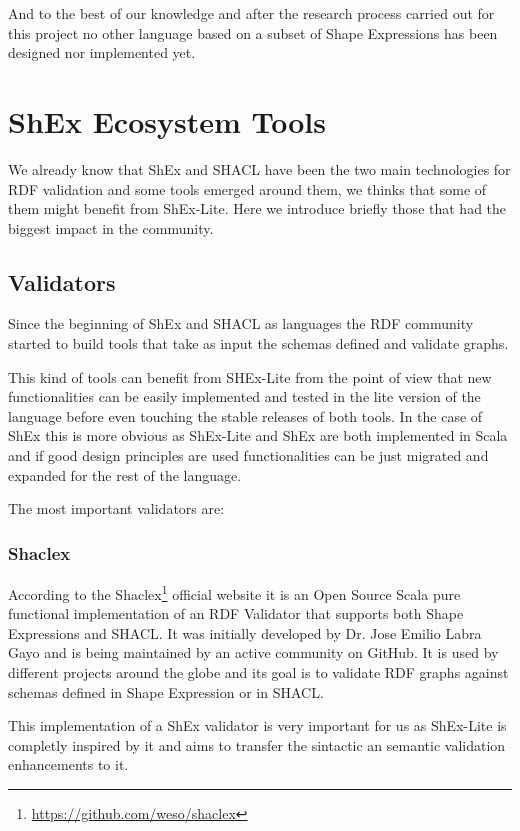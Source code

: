 \bigskip

And to the best of our knowledge and after the research process carried out for this
project no other language based on a subset of Shape Expressions has been designed nor implemented yet.


\section{ShEx Ecosystem Tools}
\label{sec:related-work-shex-ecosystem}

We already know that ShEx and SHACL have been the two main technologies for RDF validation and some tools
emerged around them, we thinks that some of them might benefit from ShEx-Lite. Here we introduce briefly
those that had the biggest impact in the community.

\subsection{Validators}
Since the beginning of ShEx and SHACL as languages the RDF community started to build tools that take as
input the schemas defined and validate graphs.

This kind of tools can benefit from SHEx-Lite from the point of view that new functionalities can be easily
implemented and tested in the lite version of the language before even touching the stable releases of both
tools. In the case of ShEx this is more obvious as ShEx-Lite and ShEx are both implemented in Scala and if
good design principles are used functionalities can be just migrated and expanded for the rest of the language.

The most important validators are:

\subsubsection{Shaclex}
According to the Shaclex\footnote{\url{https://github.com/weso/shaclex}} official website it is an Open
Source Scala pure functional implementation of an RDF Validator that supports both Shape Expressions and
SHACL. It was initially developed by Dr. Jose Emilio Labra Gayo and is being maintained by an active
community on GitHub. It is used by different projects around the globe and its goal is to validate RDF
graphs against schemas defined in Shape Expression or in SHACL.

This implementation of a ShEx validator is very important for us as ShEx-Lite is completly inspired by it
and aims to transfer the sintactic an semantic validation enhancements to it.

